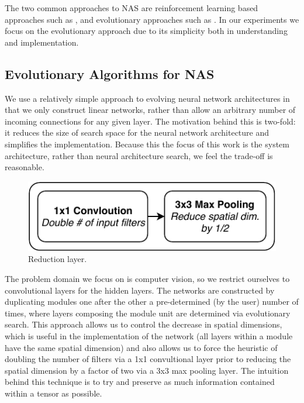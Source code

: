 \documentclass[conference]{IEEEtran}
\begin{document}
The two common approaches to NAS are reinforcement learning based approaches such
as \cite{45826, Kyriakides:2018:NAS:3200947.3208068, pmlr-v80-pham18a}, and
evolutionary approaches such as \cite{DBLP:journals/corr/abs-1711-00436,
  DBLP:journals/corr/MiikkulainenLMR17, DBLP:conf/icml/RealMSSSTLK17}. In our
experiments we focus on the evolutionary approach due to its simplicity both in
understanding and implementation.

\subsection{Evolutionary Algorithms for NAS}
We use a relatively simple approach to evolving neural network architectures
in that we only construct linear networks, rather than allow an arbitrary
number of incoming connections for any given layer. The motivation behind
this is two-fold: it reduces the size of search space for the neural network
architecture and simplifies the implementation. Because this the focus of
this work is the system architecture, rather than neural architecture search,
we feel the trade-off is reasonable.

\begin{figure}
  \includegraphics{img/reduction}
  \caption{Reduction layer.}
  \label{fig:reduction}
\end{figure}

The problem domain we focus on is computer vision, so we restrict ourselves
to convolutional layers for the hidden layers. The networks are constructed
by duplicating modules one after the other a pre-determined (by the user)
number of times, where layers composing the module unit are
determined via evolutionary search. This approach allows us to control the
decrease in spatial dimensions, which is useful in the implementation of
the network (all layers within a module have the same spatial dimension)
and also allows us to force the heuristic of doubling the number of filters
via a 1x1 convultional layer prior to reducing the spatial dimension by a
factor of two via a 3x3 max pooling layer. The intuition behind this
technique is to try and preserve as much information contained within a
tensor as possible.
\end{document}
